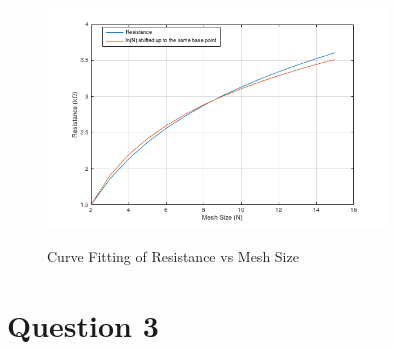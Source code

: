 \documentclass[11pt]{amsart}
\begin{document}
\begin{center}
	\begin{figure}[h]
		\caption{Curve Fitting of Resistance vs Mesh Size}
		\includegraphics[width=0.8\textwidth]{assets/fit_r.png}\label{fig:fit_r}
	\end{figure}
\end{center}
\pagebreak

\section*{Question 3}
\end{document}
